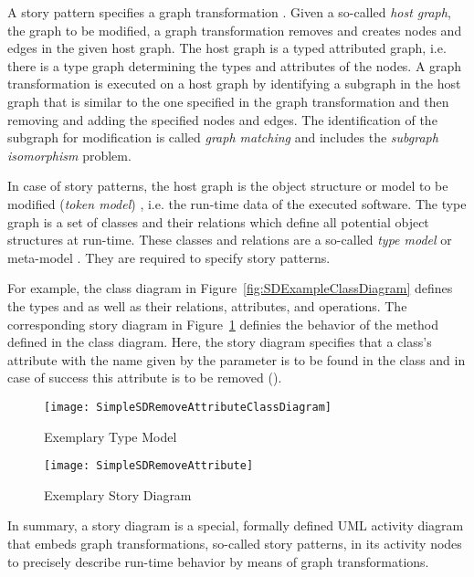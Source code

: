 A story pattern specifies a graph transformation \cite{Roz97}.
Given a so-called \emph{host graph}, the graph to be modified, a graph transformation removes and creates nodes and edges in the given host graph.
The host graph is a typed attributed graph, i.e. there is a type graph determining the types and attributes of the nodes.
A graph transformation is executed on a host graph by identifying a subgraph in the host graph that is similar to the one specified in the graph transformation and then removing and adding the specified nodes and edges.
The identification of the subgraph for modification is called \emph{graph matching} and includes the \emph{subgraph isomorphism} problem.

In case of story patterns, the host graph is the object structure or model to be modified (\emph{token model}) \cite{Kue06},
i.e. the run-time data of the executed software.
The type graph is a set of classes and their relations which define all potential object structures at run-time.
These classes and relations are a so-called \emph{type model} or meta-model \cite{Kue06}.
They are required to specify story patterns.

For example, the class diagram in Figure~\ref{fig:SDExampleClassDiagram} defines the types  and  as well as their relations, attributes, and operations.
The corresponding story diagram in Figure~\ref{fig:SDExampleStoryDiagram} definies the behavior of the  method defined in the class diagram.
Here, the story diagram specifies that a class's attribute with the name given by the parameter  is to be found in the class and in case of success this attribute is to be removed (\destroy).

\begin{figure}[htb]
	\centering
  \begin{minipage}[t]{.4\textwidth}
    \centering
    \texttt{[image: SimpleSDRemoveAttributeClassDiagram]} 
    \caption{Exemplary Type Model}
    \label{fig:SDExampleClassDiagram}
  \end{minipage}%
  \hfill
  \begin{minipage}[t]{.55\textwidth}
    \centering
    \texttt{[image: SimpleSDRemoveAttribute]}
    \caption{Exemplary Story Diagram}
    \label{fig:SDExampleStoryDiagram}
  \end{minipage}
\end{figure}

In summary, a story diagram is a special, formally defined UML activity diagram
that embeds graph transformations, so-called story patterns, in its activity nodes
to precisely describe run-time behavior by means of graph transformations.

